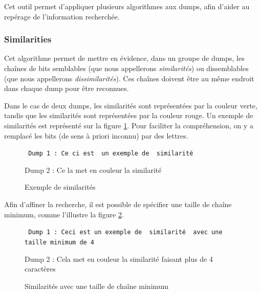 Cet outil permet d'appliquer plusieurs algorithmes aux dumps, afin d'aider au repérage de l'information recherchée.

\subsubsection{Similarities \cite {ref-vandeursen}} \label{04-similarities}

Cet algorithme permet de mettre en évidence, dans un groupe de dumps, les chaînes de bits semblables (que nous appellerons \emph{similarités}) ou dissemblables (que nous appellerons \emph{dissimilarités}). Ces chaînes doivent être au même endroit dans chaque dump pour être reconnues.

Dans le cas de deux dumps, les similarités sont représentées par la couleur verte, tandis que les similarités sont représentées par la couleur rouge. Un exemple de similarités est représenté sur la figure \ref{04-1-sim_simple}. Pour faciliter la compréhension, on y a remplacé les bits (de sens à priori inconnu) par des lettres.

\begin{figure}[!h]
  \begin{center}
  {\tt\center
  {Dump 1 : \color{simColor} Ce}{\color{dissimColor} ci es}{\color{simColor}t }{\color{dissimColor} un exemple de }{\color{simColor} similarité}

  {Dump 2 : \color{simColor} Ce}{\color{dissimColor} la me}{\color{simColor}t }{\color{dissimColor} en couleur la }{\color{simColor} similarité}
  }
  \end{center}
  \caption{Exemple de similarités}
  \label{04-1-sim_simple}
\end{figure}

Afin d'affiner la recherche, il est possible de spécifier une taille de chaîne minimum, comme l'illustre la figure \ref{04-1-sim_taille_min}.

\begin{figure}[!h]
  \begin{center}
\small{
  {\tt
  {Dump 1 : \color{dissimColor} Ceci est un exemple de }{\color{simColor} similarité }{\color{dissimColor} avec une taille minimum de 4}

  {Dump 2 : \color{dissimColor} Cela met en couleur la }{\color{simColor} similarité }{\color{dissimColor} faisant plus de 4 caractères}
  }}
  \end{center}
  \caption{Similarités avec une taille de chaîne minimum}
  \label{04-1-sim_taille_min}
\end{figure}


